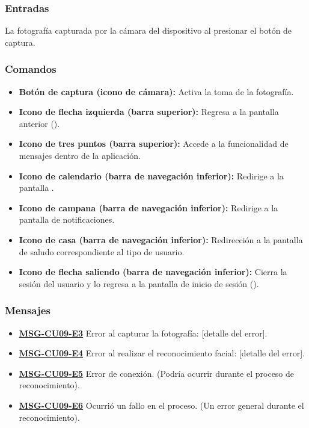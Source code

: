 \subsubsection{Entradas}
La fotografía capturada por la cámara del dispositivo al presionar el botón de captura.

\subsubsection{Comandos}
\begin{itemize}
	\item \textbf{Botón de captura (icono de cámara):} Activa la toma de la fotografía.
	\item \textbf{Icono de flecha izquierda (barra superior):} Regresa a la pantalla anterior ().
	\item \textbf{Icono de tres puntos (barra superior):} Accede a la funcionalidad de mensajes dentro de la aplicación.
	\item \textbf{Icono de calendario (barra de navegación inferior):} Redirige a la pantalla .
	\item \textbf{Icono de campana (barra de navegación inferior):} Redirige a la pantalla de notificaciones.
	\item \textbf{Icono de casa (barra de navegación inferior):} Redirección a la pantalla de saludo correspondiente al tipo de usuario.
	\item \textbf{Icono de flecha saliendo (barra de navegación inferior):} Cierra la sesión del usuario y lo regresa a la pantalla de inicio de sesión ().
\end{itemize}

\subsubsection{Mensajes}
\begin{itemize}
	\item \textbf{\hyperref[msg:CU09-E3]{MSG-CU09-E3}} Error al capturar la fotografía: [detalle del error].
	\item \textbf{\hyperref[msg:CU09-E4]{MSG-CU09-E4}} Error al realizar el reconocimiento facial: [detalle del error].
	\item \textbf{\hyperref[msg:CU09-E5]{MSG-CU09-E5}} Error de conexión. (Podría ocurrir durante el proceso de reconocimiento).
	\item \textbf{\hyperref[msg:CU09-E6]{MSG-CU09-E6}} Ocurrió un fallo en el proceso. (Un error general durante el reconocimiento).
\end{itemize}

